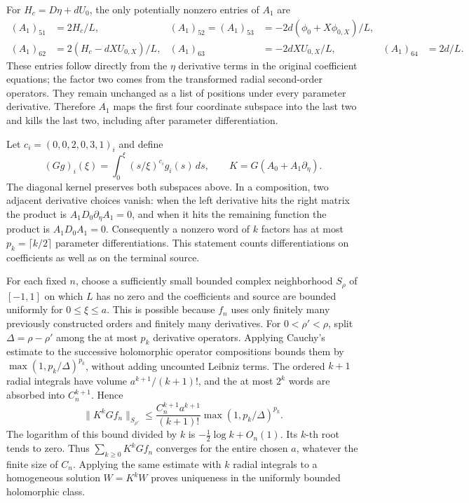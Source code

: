 \documentclass[10pt,a4paper]{article}
\begin{document}
For \(H_c=D\eta+dU_0\), the only potentially nonzero entries of \(A_1\) are \[
\begin{aligned}
(A_1)_{51}&=2H_c/L,&
(A_1)_{52}=(A_1)_{53}&=-2d(\phi_0+X\phi_{0,X})/L,\\
(A_1)_{62}&=2(H_c-dXU_{0,X})/L,&
(A_1)_{63}&=-2dXU_{0,X}/L,&
(A_1)_{64}&=2d/L.
\end{aligned}
\tag{B3}
\] These entries follow directly from the \(\eta\) derivative terms in the original coefficient equations; the factor two comes from the transformed radial second-order operators. They remain unchanged as a list of positions under every parameter derivative. Therefore \(A_1\) maps the first four coordinate subspace into the last two and kills the last two, including after parameter differentiation.

Let \(c_i=(0,0,2,0,3,1)_i\) and define \[
(Gg)_i(\xi)=\int_0^\xi(s/\xi)^{c_i}g_i(s)\,ds,
\qquad K=G(A_0+A_1\partial_\eta).
\] The diagonal kernel preserves both subspaces above. In a composition, two adjacent derivative choices vanish: when the left derivative hits the right matrix the product is \(A_1D_0\partial_\eta A_1=0\), and when it hits the remaining function the product is \(A_1D_0A_1=0\). Consequently a nonzero word of \(k\) factors has at most \(p_k=\lceil k/2\rceil\) parameter differentiations. This statement counts differentiations on coefficients as well as on the terminal source.

For each fixed \(n\), choose a sufficiently small bounded complex neighborhood \(S_\rho\) of \([-1,1]\) on which \(L\) has no zero and the coefficients and source are bounded uniformly for \(0\le\xi\le a\). This is possible because \(f_n\) uses only finitely many previously constructed orders and finitely many derivatives. For \(0<\rho'<\rho\), split \(\Delta=\rho-\rho'\) among the at most \(p_k\) derivative operators. Applying Cauchy's estimate to the successive holomorphic operator compositions bounds them by \(\max(1,p_k/\Delta)^{p_k}\), without adding uncounted Leibniz terms. The ordered \(k+1\) radial integrals have volume \(a^{k+1}/(k+1)!\), and the at most \(2^k\) words are absorbed into \(C_n^{k+1}\). Hence \[
\|K^kGf_n\|_{S_{\rho'}}\le
\frac{C_n^{k+1}a^{k+1}}{(k+1)!}
\max(1,p_k/\Delta)^{p_k}.
\tag{B4}
\] The logarithm of this bound divided by \(k\) is \(-\tfrac12\log k+O_n(1)\). Its \(k\)-th root tends to zero. Thus \(\sum_{k\ge0}K^kGf_n\) converges for the entire chosen \(a\), whatever the finite size of \(C_n\). Applying the same estimate with \(k\) radial integrals to a homogeneous solution \(W=K^kW\) proves uniqueness in the uniformly bounded holomorphic class.
\end{document}
